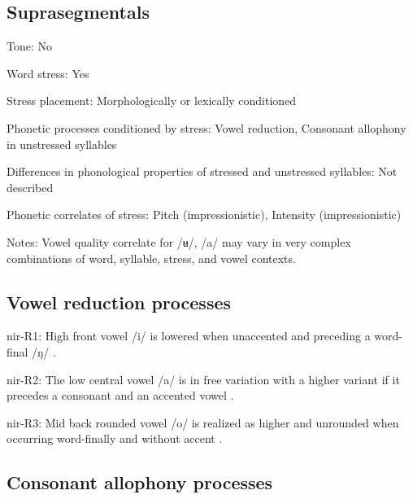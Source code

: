 {\subsection*{Suprasegmentals}
\begin{appendixdesc}
\item[Tone:] No

\item[Word stress:] Yes

\item[Stress placement:] Morphologically or lexically conditioned

\item[Phonetic processes conditioned by stress:] Vowel reduction, Consonant allophony in unstressed syllables

\item[Differences in phonological properties of stressed and unstressed syllables:] Not described

\item[Phonetic correlates of stress:] Pitch (impressionistic), Intensity (impressionistic)

\item[Notes:] Vowel quality correlate for /ʉ/, /a/ may vary in very complex combinations of word, syllable, stress, and vowel contexts.
\end{appendixdesc}
\subsection*{Vowel reduction processes}
\begin{appendixdesc}

\item[nir-R1:] High front vowel /i/ is lowered when unaccented and preceding a word-final /ŋ/ \citep[10]{Anceaux1965}.

\item[nir-R2:] The low central vowel /a/ is in free variation with a higher variant if it precedes a consonant and an accented vowel \citep[13]{Anceaux1965}.

\item[nir-R3:] Mid back rounded vowel /o/ is realized as higher and unrounded when occurring word-finally and without accent \citep[14]{Anceaux1965}.
\end{appendixdesc}
\subsection*{Consonant allophony processes}
\begin{appendixdesc}


\end{appendixdesc}}
